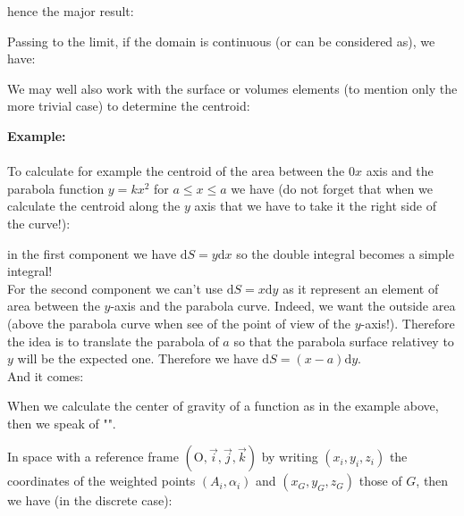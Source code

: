 	hence the major result:
	
	Passing to the limit, if the domain is continuous (or can be considered as), we have:
	
	We may well also work with the surface or volumes elements (to mention only the more trivial case) to determine the centroid:
	
	\begin{tcolorbox}[colframe=black,colback=white,sharp corners]
	\textbf{{\Large {}}Example:}\\\\
	To calculate for example the centroid of the area between the 0$x$ axis and the parabola function $y=kx^2$ for $a\leq x\leq a$ we have (do not forget that when we calculate the centroid along the $y$ axis that we have to take it the right side of the curve!):
	
	in the first component we have $\mathrm{d}S=y\mathrm{d}x$ so the double integral becomes a simple integral!\\
	
	For the second component we can't use $\mathrm{d}S=x\mathrm{d}y$ as it represent an element of area between the $y$-axis and the parabola curve. Indeed, we want the outside area (above the parabola curve when see of the point of view of the $y$-axis!). Therefore the idea is to translate the parabola of $a$ so that the parabola surface relativey to $y$ will be the expected one. Therefore we have $\mathrm{d}S=(x-a)\mathrm{d}y$.\\
	
	And it comes:
	
	\end{tcolorbox}
	\begin{tcolorbox}[title=Remark,colframe=black,arc=10pt]
	When we calculate the center of gravity of a function as in the example above, then we speak of "".
	\end{tcolorbox}
	In space with a reference frame $(\text{O},\vec{i},\vec{j},\vec{k})$ by writing $(x_i,y_i,z_i)$ the coordinates of the weighted points 
$(A_i,\alpha_i)$ and $(x_G,y_G,z_G)$ those of $G$, then we have (in the discrete case):
	
